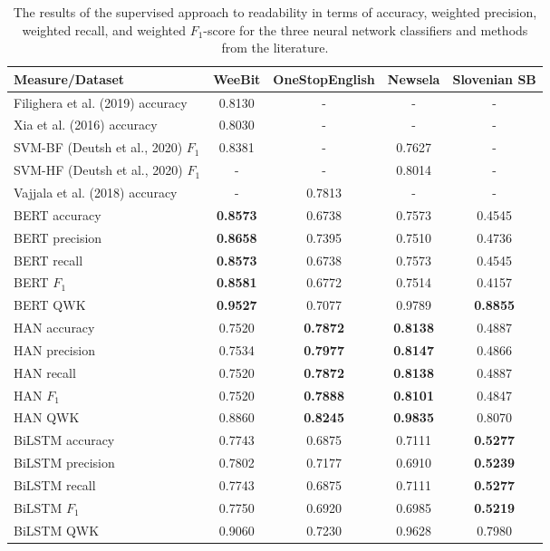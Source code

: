 \documentclass{clv3}
\begin{document}
\begin{table*}[b]
\begin{center}
\caption{The results of the supervised approach to readability in terms of accuracy, weighted precision, weighted recall, and weighted $F_1$-score for the three neural network classifiers and  methods from the literature.} 
\begin{tabular}{lcccc}
  Measure/Dataset & WeeBit & OneStopEnglish & Newsela & Slovenian SB\\
  \hline
  Filighera et al. (2019) accuracy & 0.8130 & - & - & -  \\
Xia et al. (2016) accuracy & 0.8030 & - & - & -  \\
  SVM-BF (Deutsh et al., 2020) $F_1$ & 0.8381 & - & 0.7627 & -  \\
  SVM-HF (Deutsh et al., 2020) $F_1$ &  - & - & 0.8014 & -  \\
  Vajjala et al. (2018) accuracy & - & 0.7813 & - & - \\
  
  \hline     
    BERT accuracy & \textbf{0.8573} & 0.6738 & 0.7573 & 0.4545 \\
    BERT precision & \textbf{0.8658} & 0.7395 & 0.7510 & 0.4736 \\
    BERT recall & \textbf{0.8573} & 0.6738 & 0.7573 & 0.4545 \\
    BERT $F_1$ & \textbf{0.8581} & 0.6772 & 0.7514 & 0.4157 \\
    BERT QWK & \textbf{0.9527} & 0.7077 & 0.9789 & \textbf{0.8855} \\
  \hline
    HAN accuracy & 0.7520 & \textbf{0.7872} & \textbf{0.8138} &  0.4887 \\
    HAN precision & 0.7534 & \textbf{0.7977} & \textbf{ 0.8147} & 0.4866 \\
    HAN recall & 0.7520 & \textbf{0.7872} & \textbf{0.8138} & 0.4887 \\
    HAN $F_1$ & 0.7520 & \textbf{0.7888} & \textbf{0.8101} & 0.4847 \\
    HAN QWK & 0.8860 & \textbf{0.8245} & \textbf{0.9835} &0.8070 \\
  \hline
    BiLSTM accuracy & 0.7743 & 0.6875 & 0.7111 & \textbf{0.5277}\\
    BiLSTM precision & 0.7802 & 0.7177 & 0.6910 & \textbf{0.5239}\\
    BiLSTM recall & 0.7743 & 0.6875 & 0.7111 &  \textbf{0.5277}\\
    BiLSTM $F_1$ & 0.7750 & 0.6920 & 0.6985 & \textbf{0.5219}\\
    BiLSTM QWK & 0.9060 & 0.7230 & 0.9628 & 0.7980\\
  \hline
\end{tabular}
\label{table:supervisedResults}
 \end{center}
\end{table*}
\end{document}
